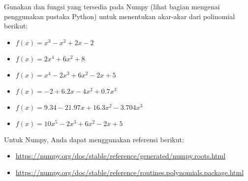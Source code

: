 \begin{soal}
Gunakan  dan fungsi yang tersedia pada Numpy
(lihat bagian mengenai penggunakan pustaka Python)
untuk menentukan akar-akar dari polinomial berikut:
\begin{itemize}
\item $f(x) = x^3 - x^2 + 2x - 2$
\item $f(x) = 2x^4 + 6x^2 + 8$
\item $f(x) = x^4 - 2x^3 + 6x^2 - 2x + 5$
\item $f(x) = -2 + 6.2x - 4x^2 + 0.7x^3$
\item $f(x) = 9.34 - 21.97x + 16.3x^2 - 3.704x^3$
\item $f(x) = 10x^5 - 2x^3 + 6x^2 - 2x + 5$
\end{itemize}
Untuk Numpy, Anda dapat menggunakan referensi berikut:
\begin{itemize}
\item {\footnotesize\url{https://numpy.org/doc/stable/reference/generated/numpy.roots.html}}
\item {\footnotesize\url{https://numpy.org/doc/stable/reference/routines.polynomials.package.html}}
\end{itemize}
\end{soal}